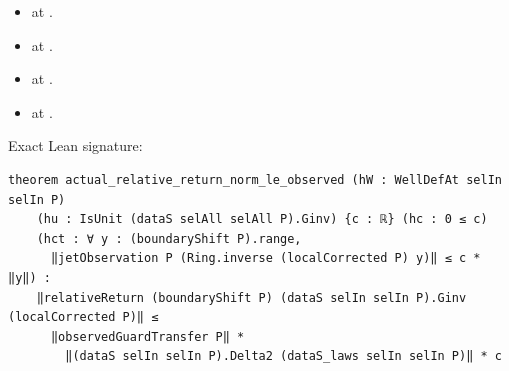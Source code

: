 \begin{theorem}[bp-045]
\begin{itemize}
\item \texttt{} at \texttt{}.
\item \texttt{} at \texttt{}.
\item \texttt{} at \texttt{}.
\item \texttt{} at \texttt{}.
\end{itemize}
\par Exact Lean signature:
\begin{verbatim}
theorem actual_relative_return_norm_le_observed (hW : WellDefAt selIn selIn P)
    (hu : IsUnit (dataS selAll selAll P).Ginv) {c : ℝ} (hc : 0 ≤ c)
    (hct : ∀ y : (boundaryShift P).range,
      ‖jetObservation P (Ring.inverse (localCorrected P) y)‖ ≤ c * ‖y‖) :
    ‖relativeReturn (boundaryShift P) (dataS selIn selIn P).Ginv (localCorrected P)‖ ≤
      ‖observedGuardTransfer P‖ *
        ‖(dataS selIn selIn P).Delta2 (dataS_laws selIn selIn P)‖ * c
\end{verbatim}
\end{theorem}

